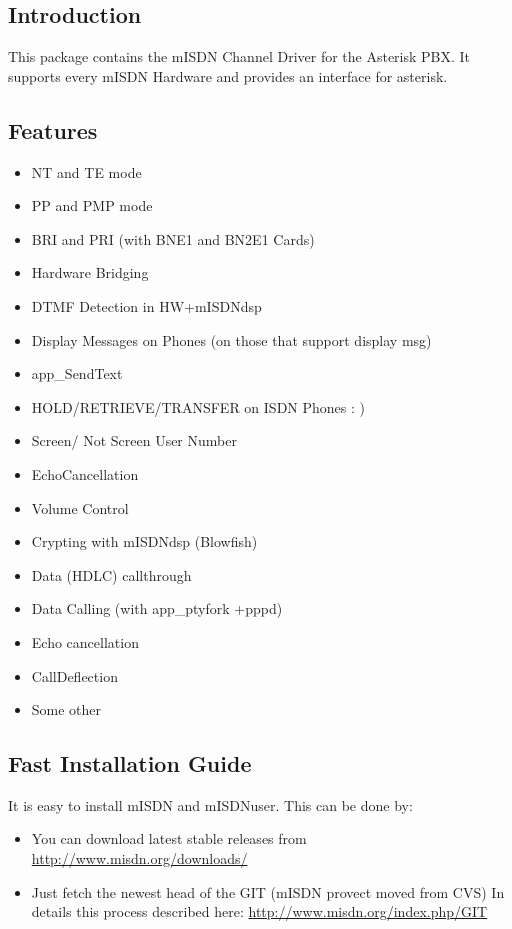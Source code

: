 \subsection{Introduction}

This package contains the mISDN Channel Driver for the Asterisk PBX. It
supports every mISDN Hardware and provides an interface for asterisk.

\subsection{Features}

\begin{itemize}
\item  NT and TE mode
\item  PP and PMP mode
\item  BRI and PRI (with BNE1 and BN2E1 Cards)
\item  Hardware Bridging
\item  DTMF Detection in HW+mISDNdsp
\item  Display Messages on Phones (on those that support display msg)
\item  app\_SendText
\item  HOLD/RETRIEVE/TRANSFER on ISDN Phones : )
\item  Screen/ Not Screen User Number
\item  EchoCancellation
\item  Volume Control
\item  Crypting with mISDNdsp (Blowfish)
\item  Data (HDLC) callthrough
\item  Data Calling (with app\_ptyfork +pppd)
\item  Echo cancellation
\item  CallDeflection
\item Some other
\end{itemize}

\subsection{Fast Installation Guide}

It is easy to install mISDN and mISDNuser. This can be done by:
\begin{itemize}
     \item You can download latest stable releases from \url{http://www.misdn.org/downloads/}

     \item Just fetch the newest head of the GIT (mISDN provect moved from CVS)
     In details this process described here: \url{http://www.misdn.org/index.php/GIT}
\end{itemize}


